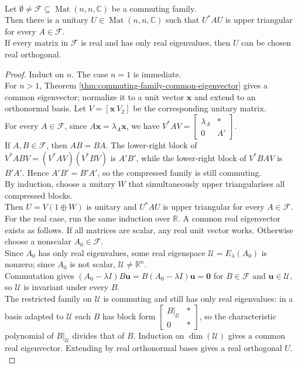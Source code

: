 \begin{theorem} \label{thm:simultaneous-schur-triangularization-commuting-family} \\
Let $\emptyset\neq\mathcal{F}\subseteq\operatorname{Mat}(n,n,\mathbb{C})$ be a commuting family.\\
Then there is a unitary $U\in\operatorname{Mat}(n,n,\mathbb{C})$ such that $U^*AU$ is upper triangular for every $A\in\mathcal{F}$.\\
If every matrix in $\mathcal{F}$ is real and has only real eigenvalues, then $U$ can be chosen real orthogonal.
\begin{proof}
Induct on $n$. The case $n=1$ is immediate.\\
For $n>1$, Theorem \ref{thm:commuting-family-common-eigenvector} gives a common eigenvector; normalize it to a unit vector $\mathbf{x}$ and extend to an orthonormal basis. Let $V=[\mathbf{x}\ V_2]$ be the corresponding unitary matrix.\\
For every $A\in\mathcal{F}$, since $A\mathbf{x}=\lambda_A\mathbf{x}$, we have $V^*AV=
\begin{bmatrix}
\lambda_A&*\\
0&A'
\end{bmatrix}$.\\
If $A,B\in\mathcal{F}$, then $AB=BA$. The lower-right block of $V^*ABV=(V^*AV)(V^*BV)$ is $A'B'$, while the lower-right block of $V^*BAV$ is $B'A'$. Hence $A'B'=B'A'$, so the compressed family is still commuting.\\
By induction, choose a unitary $W$ that simultaneously upper triangularises all compressed blocks.\\
Then $U=V(1\oplus W)$ is unitary and $U^*AU$ is upper triangular for every $A\in\mathcal{F}$.\\
For the real case, run the same induction over $\mathbb{R}$. A common real eigenvector exists as follows. If all matrices are scalar, any real unit vector works. Otherwise choose a nonscalar $A_0\in\mathcal{F}$.\\
Since $A_0$ has only real eigenvalues, some real eigenspace $\mathcal{U}=E_{\lambda}(A_0)$ is nonzero; since $A_0$ is not scalar, $\mathcal{U}\neq\mathbb{R}^n$.\\
Commutation gives $(A_0-\lambda I)B\mathbf{u}=B(A_0-\lambda I)\mathbf{u}=\mathbf{0}$ for $B\in\mathcal{F}$ and $\mathbf{u}\in\mathcal{U}$, so $\mathcal{U}$ is invariant under every $B$.\\
The restricted family on $\mathcal{U}$ is commuting and still has only real eigenvalues: in a basis adapted to $\mathcal{U}$ each $B$ has block form $\begin{bmatrix}B|_{\mathcal{U}}&*\\0&*\end{bmatrix}$, so the characteristic polynomial of $B|_{\mathcal{U}}$ divides that of $B$. Induction on $\dim(\mathcal{U})$ gives a common real eigenvector. Extending by real orthonormal bases gives a real orthogonal $U$.\\

\end{proof}
\end{theorem}
